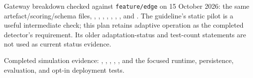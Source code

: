 \documentclass[11pt,a4paper]{article}
\begin{document}
Gateway breakdown checked against \texttt{feature/edge} on 15 October 2026:
the same artefact/scoring/schema files, ,
, ,
, ,
, , and
. The guideline's static pilot is
a useful intermediate check; this plan retains adaptive operation as the
completed detector's requirement. Its older adaptation-status and test-count
statements are not used as current status evidence.

Completed simulation evidence: ,
, ,
, , and the focused
runtime, persistence, evaluation, and opt-in deployment tests.
\end{document}
